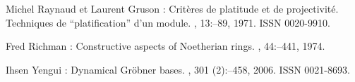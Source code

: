 \begin{thebibliography}{8}
Michel \bgroup\fonteauteurs\bgroup Raynaud\egroup\egroup{} et Laurent
  \bgroup\fonteauteurs\bgroup Gruson\egroup\egroup{} :
\newblock Crit\`eres de platitude et de projectivit\'{e}. {T}echniques de
  ``platification'' d'un module.
, 13\string:--89, 1971.
\newblock ISSN 0020-9910.

Fred \bgroup\fonteauteurs\bgroup Richman\egroup\egroup{} :
\newblock Constructive aspects of {N}oetherian rings.
, 44\string:--441,
  1974.

Ihsen \bgroup\fonteauteurs\bgroup Yengui\egroup\egroup{} :
\newblock Dynamical {G}r\"obner bases.
, 301 (2)\string:--458,
  2006.
\newblock ISSN 0021-8693.

\end{thebibliography}

\normalsize






